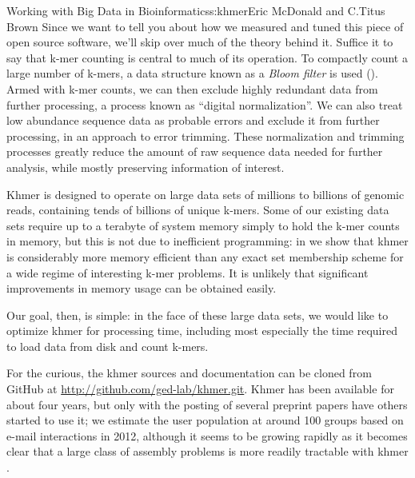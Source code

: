 \begin{aosachapter}{Working with Big Data in Bioinformatics}{s:khmer}{Eric McDonald and C.\/Titus Brown}
Since we want to tell you about how we measured and tuned this piece of
open source software, we'll skip over much of the theory behind it.
Suffice it to say that k-mer counting is central to much of its
operation. To compactly count a large number of k-mers, a data structure
known as a \emph{Bloom filter} \cite{web:BloomFilter} is used
(). Armed with k-mer counts, we can
then exclude highly redundant data from further processing, a process
known as ``digital normalization''. We can also treat low abundance
sequence data as probable errors and exclude it from further processing,
in an approach to error trimming. These normalization and trimming
processes greatly reduce the amount of raw sequence data needed for
further analysis, while mostly preserving information of interest.


Khmer is designed to operate on large data sets of millions to billions
of genomic reads, containing tends of billions of unique k-mers. Some of
our existing data sets require up to a terabyte of system memory simply
to hold the k-mer counts in memory, but this is not due to inefficient
programming: in \cite{kmer-percolation} we show that khmer is
considerably more memory efficient than any exact set membership scheme
for a wide regime of interesting k-mer problems. It is unlikely that
significant improvements in memory usage can be obtained easily.

Our goal, then, is simple: in the face of these large data sets, we
would like to optimize khmer for processing time, including most
especially the time required to load data from disk and count k-mers.

For the curious, the khmer sources and documentation can be cloned from
GitHub at \linebreak \mbox{\url{http://github.com/ged-lab/khmer.git}}.
Khmer has been available for about four years, but only with the posting
of several preprint papers have others started to use it; we estimate
the user population at around 100 groups based on e-mail interactions in
2012, although it seems to be growing rapidly as it becomes clear that a
large class of assembly problems is more readily tractable with khmer
\cite{diginorm}.


\end{aosachapter}

